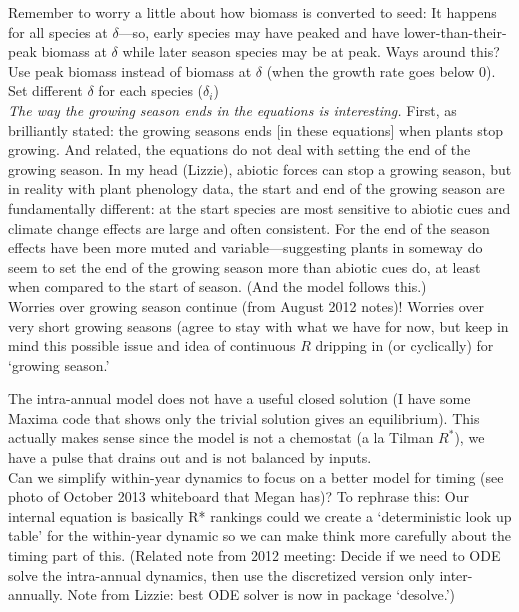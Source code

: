 \documentclass[11pt,a4paper,oneside]{article}
\begin{document}
\noindent Remember to worry a little about how biomass is converted to seed: It happens for all species at $\delta$---so, early species may have peaked and have lower-than-their-peak biomass at $\delta$ while later season species may be at peak. Ways around this?\\

\noindent Use peak biomass instead of biomass at $\delta$ (when the growth rate goes below 0). \\

\noindent Set different $\delta$ for each species ($\delta_{i}$)\\

\noindent \emph{The way the growing season ends in the equations is
interesting.} First, as brilliantly stated: the growing seasons ends
[in these equations] when plants stop growing. And related, the
equations do not deal with setting the end of the growing season. In
my head (Lizzie), abiotic forces can stop a growing season, but in
reality with plant phenology data, the start and end of the growing
season are fundamentally different: at the start species are most
sensitive to abiotic cues and climate change effects are large and
often consistent. For the end of the season effects have been more
muted and variable---suggesting plants in someway do seem to set the
end of the growing season more than abiotic cues do, at least when
compared to the start of season. (And the model follows this.)\\
Worries over growing season continue (from August 2012 notes)! Worries over very short growing seasons (agree to stay with what we have for now, but keep in mind this possible issue and idea of continuous $R$ dripping in (or cyclically) for `growing season.'

\noindent The intra-annual model does not have a useful closed solution (I
  have some Maxima code that shows only the trivial solution gives an
  equilibrium). This actually makes sense since the model is not a
  chemostat (a la Tilman \(R^{*}\)), we have a pulse that drains out
  and is not balanced by inputs.\\

 Can we simplify within-year dynamics to focus on a better model for timing (see photo of October 2013 whiteboard that Megan has)? To rephrase this: Our internal equation is basically R* rankings could we create a `deterministic look up table' for the within-year dynamic so we can make think more carefully about the timing part of this.  (Related note from 2012 meeting: Decide if we need to ODE solve the intra-annual
  dynamics, then use the discretized version only inter-annually. Note from Lizzie: best ODE solver is now in package `desolve.')\\
\end{document}
